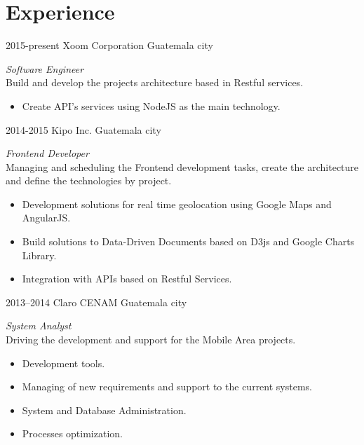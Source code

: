 \documentclass[]{friggeri-cv} %
\begin{document}
\section{Experience}
\begin{entrylist}
\entry
	{2015-present}
	{Xoom Corporation}
	{Guatemala city}
	{\emph{Software Engineer} \\
	Build and develop the projects architecture based in Restful services.
	\begin{itemize}
		\item Create API's services using NodeJS as the main technology.
	\end{itemize}
	}

\entry
	{2014-2015}
	{Kipo Inc.}
	{Guatemala city}
	{\emph{Frontend Developer} \\
	Managing and scheduling the Frontend development tasks, create the architecture and define the technologies by project.
	\begin{itemize}
		\item Development solutions for real time geolocation using Google Maps and AngularJS.
		\item Build solutions to Data-Driven Documents based on D3js and Google Charts Library.
		\item Integration with APIs based on Restful Services.
	\end{itemize}
	
	}
	
\entry
	{2013--2014}
	{Claro CENAM}
	{Guatemala city}
	{\emph{System Analyst} \\
	Driving the development and support for the Mobile Area projects.
	\begin{itemize}
		\item Development tools.
		\item Managing of new requirements and support to the current systems.
		\item System and Database Administration.
		\item Processes optimization.
		
	\end{itemize}
	
	}

\end{entrylist}

\end{document}
